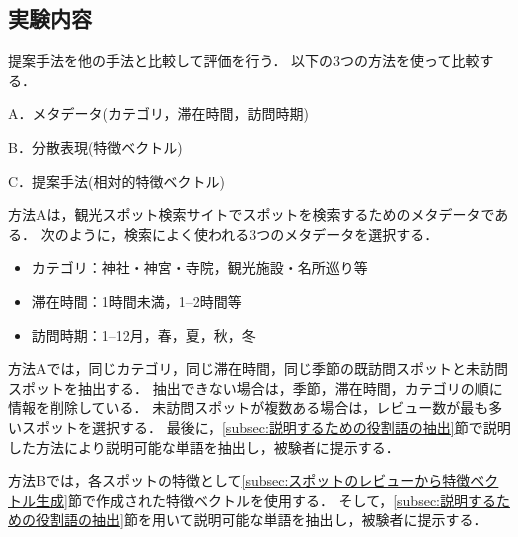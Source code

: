 \documentclass{deimj}
\begin{document}
\subsection{実験内容}
提案手法を他の手法と比較して評価を行う．
以下の3つの方法を使って比較する．
\begin{description}
  \item A．メタデータ(カテゴリ，滞在時間，訪問時期)
  \item B．分散表現(特徴ベクトル)
  \item C．提案手法(相対的特徴ベクトル)
\end{description}

方法Aは，観光スポット検索サイトでスポットを検索するためのメタデータである．
次のように，検索によく使われる3つのメタデータを選択する．
\begin{itemize}
 \item カテゴリ：神社・神宮・寺院，観光施設・名所巡り等
 \item 滞在時間：1時間未満，1--2時間等
 \item 訪問時期：1--12月，春，夏，秋，冬
\end{itemize}

方法Aでは，同じカテゴリ，同じ滞在時間，同じ季節の既訪問スポットと未訪問スポットを抽出する．
抽出できない場合は，季節，滞在時間，カテゴリの順に情報を削除している．
未訪問スポットが複数ある場合は，レビュー数が最も多いスポットを選択する．
最後に，\ref{subsec:説明するための役割語の抽出}節で説明した方法により説明可能な単語を抽出し，被験者に提示する．

方法Bでは，各スポットの特徴として\ref{subsec:スポットのレビューから特徴ベクトル生成}節で作成された特徴ベクトルを使用する．
そして，\ref{subsec:説明するための役割語の抽出}節を用いて説明可能な単語を抽出し，被験者に提示する．

\end{document}

